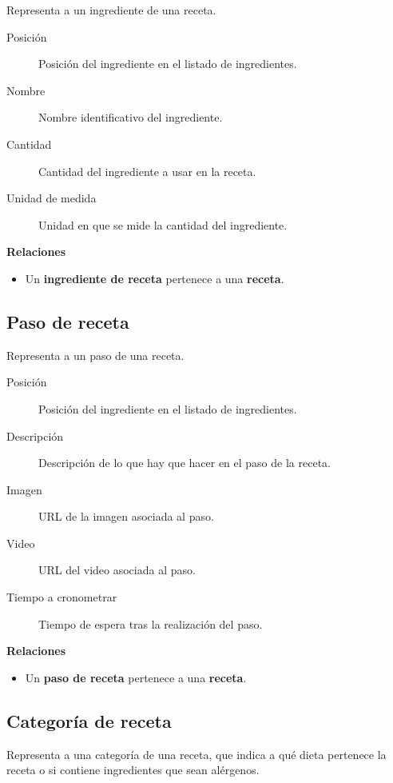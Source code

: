 Representa a un ingrediente de una receta.

\begin{description}
\item[Posición] Posición del ingrediente en el listado de ingredientes.
\item[Nombre] Nombre identificativo del ingrediente.
\item[Cantidad] Cantidad del ingrediente a usar en la receta.
\item[Unidad de medida] Unidad en que se mide la cantidad del ingrediente.
\end{description}


\textbf{Relaciones}
\begin{itemize}
\item Un \textbf{ingrediente de receta} pertenece a una \textbf{receta}.
\end{itemize}


\subsection{Paso de receta}

Representa a un paso de una receta.

\begin{description}
\item[Posición] Posición del ingrediente en el listado de ingredientes.
\item[Descripción] Descripción de lo que hay que hacer en el paso de la receta.
\item[Imagen] URL de la imagen asociada al paso.
\item[Video] URL del video asociada al paso.
\item[Tiempo a cronometrar] Tiempo de espera tras la realización del paso.
\end{description}


\textbf{Relaciones}
\begin{itemize}
\item Un \textbf{paso de receta} pertenece a una \textbf{receta}.
\end{itemize}


\subsection{Categoría de receta}

Representa a una categoría de una receta, que indica a qué dieta pertenece la
receta o si contiene ingredientes que sean alérgenos.

